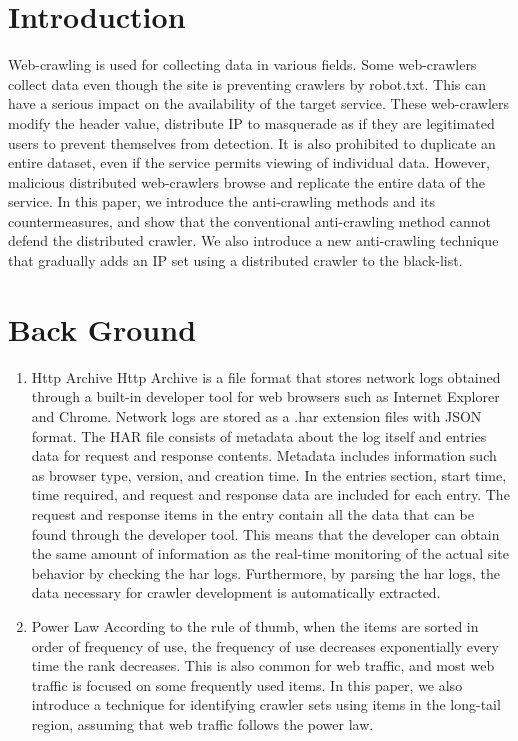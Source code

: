 %
%
\section{Introduction}
Web-crawling is used for collecting data in various fields. Some web-crawlers collect data even though the site is preventing crawlers by robot.txt. This can have a serious impact on the availability of the target service. These web-crawlers modify the header value, distribute IP to masquerade as if they are legitimated users to prevent themselves from detection.
It is also prohibited to duplicate an entire dataset, even if the service permits viewing of individual data. However, malicious distributed web-crawlers browse and replicate the entire data of the service.
In this paper, we introduce the anti-crawling methods and its countermeasures, and show that the conventional anti-crawling method cannot defend the distributed crawler. We also introduce a new anti-crawling technique that gradually adds an IP set using a distributed crawler to the black-list.



%
%
\section{Back Ground}
\begin{enumerate}
\item Http Archive
\newline Http Archive is a file format that stores network logs obtained through a built-in developer tool for web browsers such as Internet Explorer and Chrome. Network logs are stored as a .har extension files with JSON format. The HAR file consists of metadata about the log itself and entries data for request and response contents. Metadata includes information such as browser type, version, and creation time. In the entries section, start time, time required, and request and response data are included for each entry.
The request and response items in the entry contain all the data that can be found through the developer tool. This means that the developer can obtain the same amount of information as the real-time monitoring of the actual site behavior by checking the har logs. Furthermore, by parsing the har logs, the data necessary for crawler development is automatically extracted.
\newline
\item Power Law
\newline 
According to the rule of thumb, when the items are sorted in order of frequency of use, the frequency of use decreases exponentially every time the rank decreases. This is also common for web traffic, and most web traffic is focused on some frequently used items. In this paper, we also introduce a technique for identifying crawler sets using items in the long-tail region, assuming that web traffic follows the power law.
\end{enumerate}



